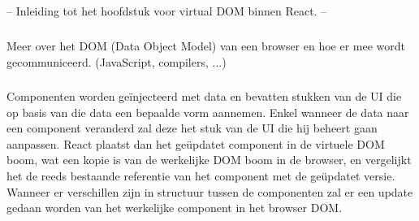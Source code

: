 \subsection{}
\label{ch:reactVirtualDOM}

-- Inleiding tot het hoofdstuk voor virtual DOM binnen React. --

\subsubsection{}
\label{sec:watIsDOM}

Meer over het DOM (Data Object Model) van een browser en hoe er mee wordt gecommuniceerd. (JavaScript, compilers, ...)

\subsubsection{}
\label{sec:virtualDOM}

Componenten worden geïnjecteerd met data en bevatten stukken van de UI die op basis van die data een bepaalde vorm aannemen. Enkel wanneer de data naar een component veranderd zal deze het stuk van de UI die hij beheert gaan aanpassen. React plaatst dan het geüpdatet component in de virtuele DOM boom, wat een kopie is van de werkelijke DOM boom in de browser, en vergelijkt het de reeds bestaande referentie van het component met de geüpdatet versie. Wanneer er verschillen zijn in structuur tussen de componenten zal er een update gedaan worden van het werkelijke component in het browser DOM.

\section{}
\label{sec:toolsOplossingen}

\subsection{}
\label{sec:webpack}

\subsection{}
\label{sec:ssr}
            
